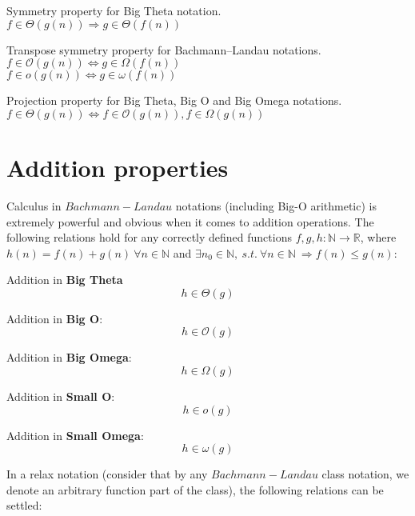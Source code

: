 \begin{theorem} Symmetry property for Big Theta notation. \\  $ f \in \Theta(g(n)) \Rightarrow g \in \Theta(f(n)) $
\end{theorem} 

\begin{theorem} Transpose symmetry property for Bachmann–Landau notations.  \\  $ f \in \mathcal{O}(g(n)) \Leftrightarrow g \in \Omega(f(n)) $
 \\  $ f \in o(g(n)) \Leftrightarrow g \in \omega(f(n)) $
\end{theorem} 
 
\begin{theorem} Projection property for Big Theta, Big O and Big Omega notations. \\  $ f \in \Theta(g(n)) \Leftrightarrow f \in \mathcal{O}(g(n)), f \in \Omega(g(n)) $
\end{theorem}
 
\section{Addition properties}
Calculus in $Bachmann-Landau$ notations (including Big-O arithmetic) is extremely powerful and obvious when it comes to addition operations. The following relations hold for any correctly defined functions $f, g, h:\mathbb{N}\longrightarrow\mathbb{R}$, where $ h(n) = f(n) + g(n)\  \forall n \in  \mathbb{N} $ and $\exists n_{0} \in \mathbb{N},\ s.t.\ \forall n \in \mathbb{N} \ \Rightarrow f(n) \leq g(n)$:

 
  \begin{lemma} Addition in \textbf{Big Theta}
 \[  h \in \Theta(g)\]
  \end{lemma}
  \begin{lemma} Addition in \textbf{Big O}: 
 \[  h \in \mathcal{O}(g)\]
  \end{lemma}
  \begin{lemma} Addition in \textbf{Big Omega}: 
 \[  h \in \Omega(g)\]
  \end{lemma}
  \begin{lemma} Addition in \textbf{Small O}:
 \[  h \in o(g)\]
  \end{lemma}
  \begin{lemma} Addition in \textbf{Small Omega}:
 \[  h \in \omega(g)\]
  \end{lemma}

  In a relax notation (consider that by any $Bachmann-Landau$ class notation, we denote an arbitrary function part of the class), the following relations can be settled:

